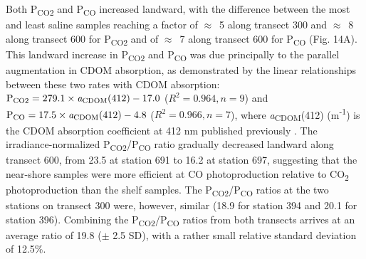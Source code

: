 \documentclass[essd, manuscript]{copernicus}
\begin{document}
Both P\textsubscript{CO2} and P\textsubscript{CO} increased landward, with the difference between the most and least saline samples reaching a factor of $\approx$~5 along transect 300 and $\approx$~8 along transect 600 for P\textsubscript{CO2} and of $\approx$~7 along transect 600 for P\textsubscript{CO} (Fig. 14A). This landward increase in P\textsubscript{CO2} and P\textsubscript{CO} was due principally to the parallel augmentation in CDOM absorption, as demonstrated by the linear relationships between these two rates with CDOM absorption: $\text{P}\textsubscript{CO2} = 279.1\times\textit{a}\textsubscript{CDOM}(412) - 17.0$ ($R^2 = 0.964, n = 9$) and $\text{P}\textsubscript{CO} = 17.5\times\textit{a}\textsubscript{CDOM}(412) - 4.8$ ($R^2 = 0.966, n = 7$), where \textit{a}\textsubscript{CDOM}(412) (m\textsuperscript{-1}) is the CDOM absorption coefficient at 412 nm published previously \citep{Song2013, Taalba2013}. The irradiance-normalized P\textsubscript{CO2}/P\textsubscript{CO} ratio gradually decreased landward along transect 600, from 23.5 at station 691 to 16.2 at station 697, suggesting that the near-shore samples were more efficient at CO photoproduction relative to CO\textsubscript{2} photoproduction than the shelf samples. The P\textsubscript{CO2}/P\textsubscript{CO} ratios at the two stations on transect 300 were, however, similar (18.9 for station 394 and 20.1 for station 396). Combining the P\textsubscript{CO2}/P\textsubscript{CO} ratios from both transects arrives at an average ratio of 19.8 ($\pm$ 2.5 SD), with a rather small relative standard deviation of 12.5\%.  
\end{document}
